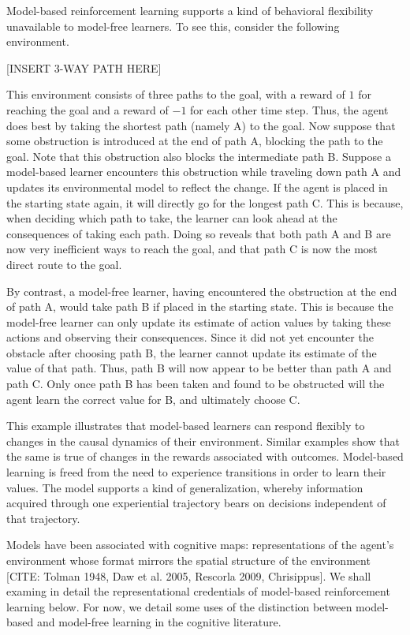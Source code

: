 Model-based reinforcement learning supports a kind of behavioral flexibility unavailable to model-free learners.
To see this, consider the following environment.

\begin{center}
	[INSERT 3-WAY PATH HERE]
\end{center}

This environment consists of three paths to the goal, with a reward of $1$ for reaching the goal and a reward of $-1$ for each other time step.
Thus, the agent does best by taking the shortest path (namely A) to the goal.
Now suppose that some obstruction is introduced at the end of path A, blocking the path to the goal.
Note that this obstruction also blocks the intermediate path B.
Suppose a model-based learner encounters this obstruction while traveling down path A and updates its environmental model to reflect the change.
If the agent is placed in the starting state again, it will directly go for the longest path C.
This is because, when deciding which path to take, the learner can look ahead at the consequences of taking each path.
Doing so reveals that both path A and B are now very inefficient ways to reach the goal, and that path C is now the most direct route to the goal.

By contrast, a model-free learner, having encountered the obstruction at the end of path A, would take path B if placed in the starting state.
This is because the model-free learner can only update its estimate of action values by taking these actions and observing their consequences.
Since it did not yet encounter the obstacle after choosing path B, the learner cannot update its estimate of the value of that path.
Thus, path B will now appear to be better than path A and path C.
Only once path B has been taken and found to be obstructed will the agent learn the correct value for B, and ultimately choose C.

This example illustrates that model-based learners can respond flexibly to changes in the causal dynamics of their environment.
Similar examples show that the same is true of changes in the rewards associated with outcomes.
Model-based learning is freed from the need to experience transitions in order to learn their values.
The model supports a kind of generalization, whereby information acquired through one experiential trajectory bears on decisions independent of that trajectory.


Models have been associated with cognitive maps: representations of the agent's environment whose format mirrors the spatial structure of the environment [CITE: Tolman 1948, Daw et al. 2005, Rescorla 2009, Chrisippus].
We shall examing in detail the representational credentials of model-based reinforcement learning below.
For now, we detail some uses of the distinction between model-based and model-free learning in the cognitive literature.

